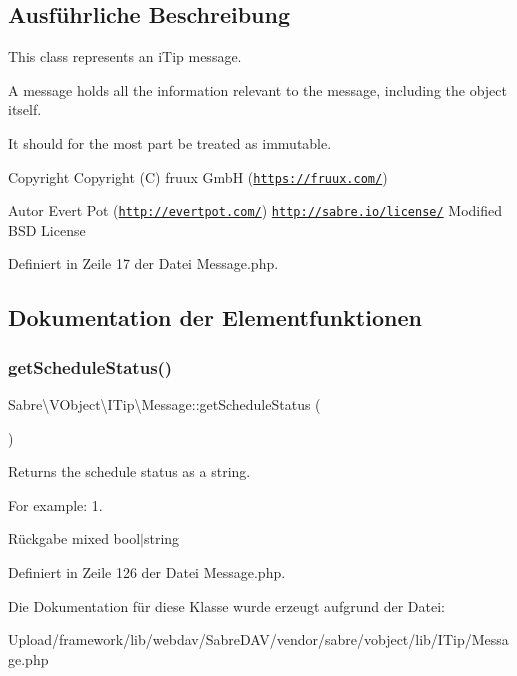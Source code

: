 \subsection{Ausführliche Beschreibung}
This class represents an i\+Tip message.

A message holds all the information relevant to the message, including the object itself.

It should for the most part be treated as immutable.

\begin{DoxyCopyright}{Copyright}
Copyright (C) fruux GmbH (\href{https://fruux.com/}{\tt https\+://fruux.\+com/}) 
\end{DoxyCopyright}
\begin{DoxyAuthor}{Autor}
Evert Pot (\href{http://evertpot.com/}{\tt http\+://evertpot.\+com/})  \href{http://sabre.io/license/}{\tt http\+://sabre.\+io/license/} Modified B\+SD License 
\end{DoxyAuthor}


Definiert in Zeile 17 der Datei Message.\+php.



\subsection{Dokumentation der Elementfunktionen}
\mbox{\label{class_sabre_1_1_v_object_1_1_i_tip_1_1_message_a4b4eb4cf2f7947e7e3d4c7331fca237a}} 
\subsubsection{\texorpdfstring{get\+Schedule\+Status()}{getScheduleStatus()}}
{\footnotesize\ttfamily Sabre\textbackslash{}\+V\+Object\textbackslash{}\+I\+Tip\textbackslash{}\+Message\+::get\+Schedule\+Status (\begin{DoxyParamCaption}{ }\end{DoxyParamCaption})}

Returns the schedule status as a string.

For example\+: 1.

\begin{DoxyReturn}{Rückgabe}
mixed bool$\vert$string 
\end{DoxyReturn}


Definiert in Zeile 126 der Datei Message.\+php.



Die Dokumentation für diese Klasse wurde erzeugt aufgrund der Datei\+:\begin{DoxyCompactItemize}
\item 
Upload/framework/lib/webdav/\+Sabre\+D\+A\+V/vendor/sabre/vobject/lib/\+I\+Tip/Message.\+php\end{DoxyCompactItemize}
